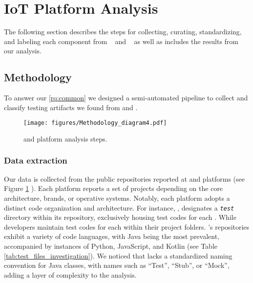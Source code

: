 \section{IoT Platform Analysis}\label{platforms}

The following section describes the steps for collecting, curating, standardizing, and labeling each component from \openhab~\cite{openhab} and \homeassistant~\cite{homeassistant} as well as includes the results from our analysis.


\subsection{Methodology}

To answer our \ref{rq:common} we designed a semi-automated pipeline to collect and classify testing artifacts we found from \openhab and \homeassistant. 








\begin{figure}[ht]
  \centering
  \texttt{[image: figures/Methodology\_diagram4.pdf]}
  \caption{\homeassistant and \openhab platform analysis steps.}
  \label{fig:methodology}
\end{figure}

\subsubsection{Data extraction}
Our data is collected from the public \github repositories reported at \homeassistant and \openhab platforms (see Figure \ref{fig:methodology} ). Each platform reports a set of projects depending on the core architecture, brands, or operative systems. Notably, each platform adopts a distinct code organization and architecture. For instance, \homeassistant,  designates a \texttt{\textit{test}} directory within its repository, exclusively housing test codes for each \addon. While \openhab developers maintain test codes for each \addon within their project folders. \openhab's repositories exhibit a variety of code languages, with Java being the most prevalent, accompanied by instances of Python, JavaScript, and Kotlin (see Table \ref{tab:test_files_investigation}). We noticed that \openhab lacks a standardized naming convention for Java classes, with names such as ``Test'', ``Stub'', or ``Mock'', adding a layer of complexity to the analysis.




